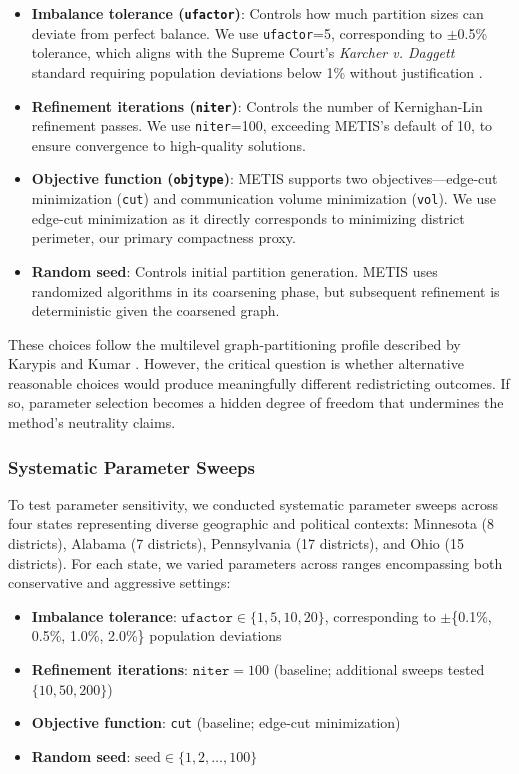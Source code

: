 \begin{itemize}
    \item \textbf{Imbalance tolerance (\texttt{ufactor})}: Controls how much partition sizes can deviate from perfect balance. We use \texttt{ufactor}=5, corresponding to $\pm$0.5\% tolerance, which aligns with the Supreme Court's \textit{Karcher v. Daggett} standard requiring population deviations below 1\% without justification \citep{karcher1983}.

    \item \textbf{Refinement iterations (\texttt{niter})}: Controls the number of Kernighan-Lin refinement passes. We use \texttt{niter}=100, exceeding METIS's default of 10, to ensure convergence to high-quality solutions.

    \item \textbf{Objective function (\texttt{objtype})}: METIS supports two objectives---edge-cut minimization (\texttt{cut}) and communication volume minimization (\texttt{vol}). We use edge-cut minimization as it directly corresponds to minimizing district perimeter, our primary compactness proxy.

    \item \textbf{Random seed}: Controls initial partition generation. METIS uses randomized algorithms in its coarsening phase, but subsequent refinement is deterministic given the coarsened graph.
\end{itemize}

These choices follow the multilevel graph-partitioning profile described by Karypis and Kumar \citep{karypis1998fast}. However, the critical question is whether alternative reasonable choices would produce meaningfully different redistricting outcomes. If so, parameter selection becomes a hidden degree of freedom that undermines the method's neutrality claims.

\subsubsection{Systematic Parameter Sweeps}
\label{sec:parameter-sweeps}

To test parameter sensitivity, we conducted systematic parameter sweeps across four states representing diverse geographic and political contexts: Minnesota (8 districts), Alabama (7 districts), Pennsylvania (17 districts), and Ohio (15 districts). For each state, we varied parameters across ranges encompassing both conservative and aggressive settings:

\begin{itemize}
    \item \textbf{Imbalance tolerance}: $\texttt{ufactor} \in \{1, 5, 10, 20\}$, corresponding to $\pm$\{0.1\%, 0.5\%, 1.0\%, 2.0\%\} population deviations
    \item \textbf{Refinement iterations}: $\texttt{niter}=100$ (baseline; additional sweeps tested $\{10, 50, 200\}$)
    \item \textbf{Objective function}: \texttt{cut} (baseline; edge-cut minimization)
    \item \textbf{Random seed}: $\text{seed} \in \{1, 2, \ldots, 100\}$
\end{itemize}

